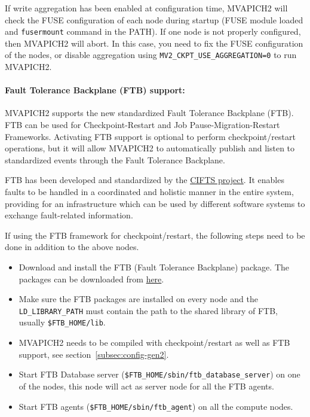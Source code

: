 If write aggregation has been enabled at configuration time, MVAPICH2 will
check the FUSE configuration of each node during startup (FUSE module loaded
and \texttt{fusermount} command in the PATH). If one node is not properly
configured, then MVAPICH2 will abort. In this case, you need to fix the FUSE
configuration of the nodes, or disable aggregation using
\texttt{MV2\_CKPT\_USE\_AGGREGATION=0} to run MVAPICH2.


\paragraph{Fault Tolerance Backplane (FTB) support:}
\label{para:mpi-cr-ftb}

MVAPICH2 supports the new standardized Fault Tolerance Backplane (FTB).  FTB can
be used for Checkpoint-Restart and Job Pause-Migration-Restart Frameworks.
Activating FTB support is optional to perform checkpoint/restart operations, but
it will allow MVAPICH2 to automatically publish and listen to standardized
events through the Fault Tolerance Backplane.


FTB has been developed and standardized by the
\href{http://www.mcs.anl.gov/research/cifts/}{CIFTS project}.  It enables faults
to be handled in a coordinated and holistic manner in the entire system,
providing for an infrastructure which can be used by different software systems
to exchange fault-related information.

If using the FTB framework for checkpoint/restart, the following steps need to
be done in addition to the above nodes.

\begin{itemize}

    \item Download and install the FTB (Fault Tolerance Backplane) package. The
    packages can be downloaded from
    \href{https://github.com/codes-org/codes/releases}{here}.

    \item Make sure the FTB packages are installed on every node and the
    \texttt{LD\_LIBRARY\_PATH} must contain the path to the shared library of
    FTB, usually \texttt{\${FTB\_HOME}/lib}.

    \item MVAPICH2 needs to be compiled with checkpoint/restart as well as FTB
    support, see section~\ref{subsec:config-gen2}.

    \item Start FTB Database server
    (\texttt{\${FTB\_HOME}/sbin/ftb\_database\_server}) on one of the nodes,
    this node will act as server node for all the FTB agents.

	\item Start FTB agents (\texttt{\${FTB\_HOME}/sbin/ftb\_agent}) on all the compute nodes.

\end{itemize}

